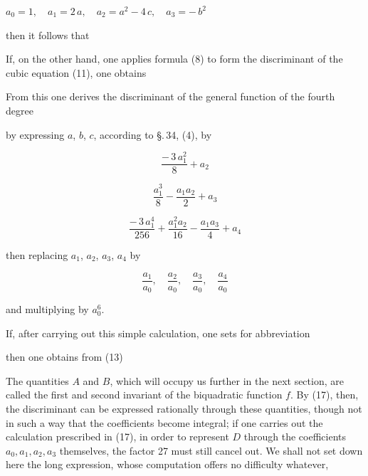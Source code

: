 
$a_0 = 1, \quad a_1 = 2\,a, \quad a_2 = a^2 - 4\,c, \quad a_3 = -\,b^2$

then it follows that

If, on the other hand, one applies formula (8) to form the discriminant of the cubic equation (11), one obtains


From this one derives the discriminant of the general function of the fourth degree


by expressing $a$, $b$, $c$, according to \S.\,34, (4), by

\[
\frac{-\,3\,a_1^2}{8} + a_2
\]

\[
\frac{a_1^3}{8} - \frac{a_1 a_2}{2} + a_3
\]

\[
\frac{-\,3\,a_1^4}{256} + \frac{a_1^2 a_2}{16} - \frac{a_1 a_3}{4} + a_4
\]

then replacing $a_1$, $a_2$, $a_3$, $a_4$ by

\[
\frac{a_1}{a_0}, \quad \frac{a_2}{a_0}, \quad \frac{a_3}{a_0}, \quad \frac{a_4}{a_0}
\]

and multiplying by $a_0^6$.

If, after carrying out this simple calculation, one sets for abbreviation



then one obtains from (13)


The quantities $A$ and $B$, which will occupy us further in the next section, are called the first and second invariant of the biquadratic function $f$. By (17), then, the discriminant can be expressed rationally through these quantities, though not in such a way that the coefficients become integral; if one carries out the calculation prescribed in (17), in order to represent $D$ through the coefficients $a_0, a_1, a_2, a_3$ themselves, %
the factor 27 must still cancel out. We shall not set down here the long expression, whose computation offers no difficulty whatever,

